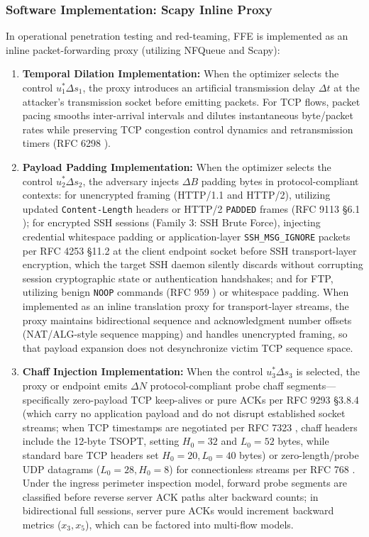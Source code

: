 \documentclass[pdflatex,sn-mathphys-num]{sn-jnl}
\theoremstyle{thmstyleone}
\theoremstyle{thmstyletwo}
\theoremstyle{thmstylethree}
\begin{document}
\subsubsection{Software Implementation: Scapy Inline Proxy}
In operational penetration testing and red-teaming, FFE is implemented as an inline packet-forwarding proxy (utilizing NFQueue and Scapy):
\begin{enumerate}
    \item \textbf{Temporal Dilation Implementation:} When the optimizer selects the control $u_1^* \Delta s_1$, the proxy introduces an artificial transmission delay $\Delta t$ at the attacker's transmission socket before emitting packets. For TCP flows, packet pacing smooths inter-arrival intervals and dilutes instantaneous byte/packet rates while preserving TCP congestion control dynamics and retransmission timers (RFC 6298 \cite{rfc6298}).
    \item \textbf{Payload Padding Implementation:} When the optimizer selects the control $u_2^* \Delta s_2$, the adversary injects $\Delta B$ padding bytes in protocol-compliant contexts: for unencrypted framing (HTTP/1.1 and HTTP/2), utilizing updated \texttt{Content-Length} headers or HTTP/2 \texttt{PADDED} frames (RFC 9113 \S 6.1 \cite{rfc9113}); for encrypted SSH sessions (Family 3: SSH Brute Force), injecting credential whitespace padding or application-layer \texttt{SSH\_MSG\_IGNORE} packets per RFC 4253 \S 11.2 \cite{rfc4253} at the client endpoint socket before SSH transport-layer encryption, which the target SSH daemon silently discards without corrupting session cryptographic state or authentication handshakes; and for FTP, utilizing benign \texttt{NOOP} commands (RFC 959 \cite{rfc959}) or whitespace padding. When implemented as an inline translation proxy for transport-layer streams, the proxy maintains bidirectional sequence and acknowledgment number offsets (NAT/ALG-style sequence mapping) and handles unencrypted framing, so that payload expansion does not desynchronize victim TCP sequence space.
    \item \textbf{Chaff Injection Implementation:} When the control $u_3^* \Delta s_3$ is selected, the proxy or endpoint emits $\Delta N$ protocol-compliant probe chaff segments---specifically zero-payload TCP keep-alives or pure ACKs per RFC 9293 \S 3.8.4 \cite{rfc9293} (which carry no application payload and do not disrupt established socket streams; when TCP timestamps are negotiated per RFC 7323 \cite{rfc7323}, chaff headers include the 12-byte TSOPT, setting $H_0 = 32$ and $L_0 = 52$ bytes, while standard bare TCP headers set $H_0 = 20, L_0 = 40$ bytes) or zero-length/probe UDP datagrams ($L_0 = 28, H_0 = 8$) for connectionless streams per RFC 768 \cite{rfc768}. Under the ingress perimeter inspection model, forward probe segments are classified before reverse server ACK paths alter backward counts; in bidirectional full sessions, server pure ACKs would increment backward metrics ($x_3, x_5$), which can be factored into multi-flow models.

\end{enumerate}
\end{document}
